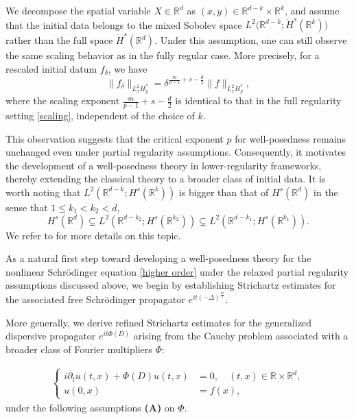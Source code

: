 \documentclass[a4paper,11pt, reqno]{amsart}
\theoremstyle{definition}
\theoremstyle{remark}
\numberwithin{equation}{section}
\begin{document}
We decompose the spatial variable $X \in \mathbb{R}^d$ as $(x, y) \in \mathbb{R}^{d-k} \times \mathbb{R}^k$, and assume that the initial data belongs to the mixed Sobolev space $L^2(\mathbb{R}^{d-k}; {\dot{H}^s(\mathbb{R}^k))}$ rather than the full space {$\dot{H}^s(\mathbb{R}^d)$}.  Under this assumption, one can still observe the same scaling behavior as in the fully regular case. More precisely, for a rescaled initial datum $f_\delta$, we have
$$\| f_{\delta}\|_{L_x^2 \dot{H}_y^s} =  \delta^{\frac{m}{p-1} + s - \frac{d}{2}} \|f\|_{L_x^2 \dot{H}_y^s},$$
where the scaling exponent $ \frac{m}{p-1} + s - \frac{d}{2}$ is identical to that in the full regularity setting \eqref{scaling}, independent of the choice of $k$.

This observation suggests that the critical exponent $p$ for well-posedness remains unchanged even under partial regularity assumptions. Consequently, it motivates the development of a well-posedness theory in lower-regularity frameworks, thereby extending the classical theory to a broader class of initial data. It is worth noting that   $L^2 (\mathbb{R}^{d-k}; H^s (\mathbb{R}^k))$ is bigger than that of $H^s(\mathbb{R}^{d})$  in the sense that $1\leq k_1 < k_2 <d$,
	$$
	H^s(\mathbb{R}^{d}) \subsetneq L^2 (\mathbb{R}^{d-k_2}; H^s (\mathbb{R}^{k_2})) \subsetneq L^2 (\mathbb{R}^{d-k_1}; H^s (\mathbb{R}^{k_1})).
	$$ We refer to \cite{KLS23} for more details on this topic. 

    
	
	
	
	
	As a natural first step toward developing a well-posedness theory for the nonlinear Schrödinger equation \eqref{higher order} under the relaxed partial regularity assumptions discussed above, we begin by establishing Strichartz estimates for the associated free Schrödinger propagator $e^{it (-\Delta)^{\frac{m}{2}}}$. 
    
    More generally, we derive refined Strichartz estimates for the generalized dispersive propagator $e^{it \Phi(D)}$ arising from the Cauchy problem associated with a broader class of Fourier multipliers $\Phi$:

    \begin{align}\label{eq10homo}
		\left\{\begin{aligned}
			i \partial_t u(t, x)+\Phi(D) u(t, x) & =0, \quad (t, x) \in \mathbb{R} \times \mathbb{R}^{d}, \\
			u(0, x) & =f(x),
		\end{aligned}\right.
	\end{align}
    under the following  assumptions {\bf(A)} on $\Phi.$  
\end{document}
